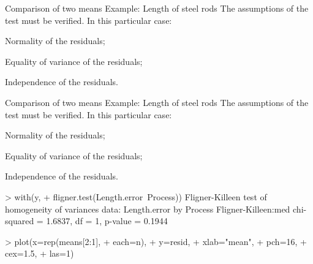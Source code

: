 \documentclass[t]{beamer}
\begin{document}

\begin{ftstf}
{Comparison of two means}
{Example: Length of steel rods}
The assumptions of the test must be verified. In this particular case:

\bitems \alert{Normality of the residuals};
\item Equality of variance of the residuals;
\item Independence of the residuals.
\eitem
{}
\end{ftstf}


\begin{ftstf}
{Comparison of two means}
{Example: Length of steel rods}
The assumptions of the test must be verified. In this particular case:

\bitems Normality of the residuals;
\item \alert{Equality of variance of the residuals};
\item Independence of the residuals.
\eitem
\begin{rcode}
> with(y,
+      fligner.test(Length.error~Process))
Fligner-Killeen test of homogeneity of variances
data:  Length.error by Process
Fligner-Killeen:med chi-squared = 1.6837, 
df = 1, p-value = 0.1944

> plot(x=rep(means[2:1],
+            each=n),
+      y=resid,
+      xlab="mean",
+      pch=16,
+      cex=1.5,
+      las=1)
\end{rcode}
\end{ftstf}
\end{document}
